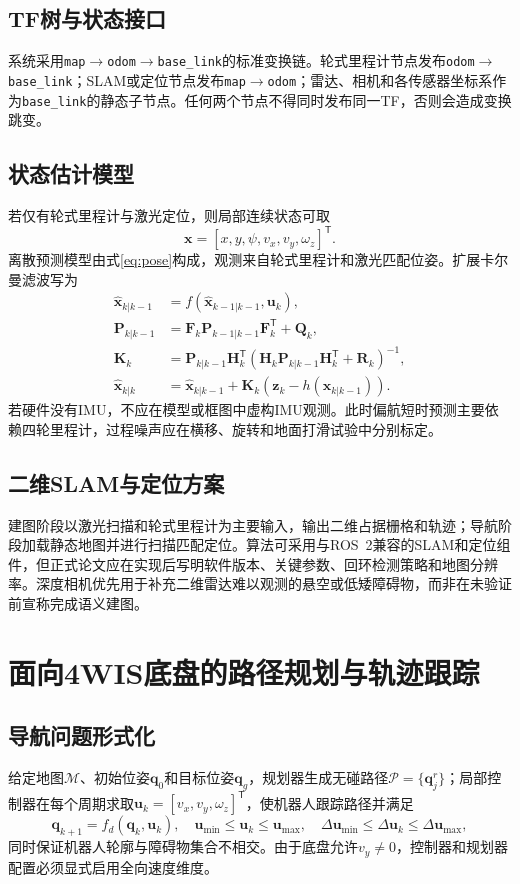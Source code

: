 \documentclass[UTF8,openany,12pt,a4paper]{ctexrep}
\newcommand{\trans}{^{\mathsf T}}
\begin{document}
\section{TF树与状态接口}
系统采用\texttt{map}$\to$\texttt{odom}$\to$\texttt{base\_link}的标准变换链。轮式里程计节点发布\texttt{odom}$\to$\texttt{base\_link}；SLAM或定位节点发布\texttt{map}$\to$\texttt{odom}；雷达、相机和各传感器坐标系作为\texttt{base\_link}的静态子节点。任何两个节点不得同时发布同一TF，否则会造成变换跳变。

\section{状态估计模型}
若仅有轮式里程计与激光定位，则局部连续状态可取
\begin{equation}\bm x=[x,y,\psi,v_x,v_y,\omega_z]\trans.\end{equation}
离散预测模型由式\eqref{eq:pose}构成，观测来自轮式里程计和激光匹配位姿。扩展卡尔曼滤波写为
\begin{align}
\hat{\bm x}_{k|k-1}&=f(\hat{\bm x}_{k-1|k-1},\bm u_k),\\
\bm P_{k|k-1}&=\bm F_k\bm P_{k-1|k-1}\bm F_k\trans+\bm Q_k,\\
\bm K_k&=\bm P_{k|k-1}\bm H_k\trans(\bm H_k\bm P_{k|k-1}\bm H_k\trans+\bm R_k)^{-1},\\
\hat{\bm x}_{k|k}&=\hat{\bm x}_{k|k-1}+\bm K_k(\bm z_k-h(\hat{\bm x}_{k|k-1})).
\end{align}
若硬件没有IMU，不应在模型或框图中虚构IMU观测。此时偏航短时预测主要依赖四轮里程计，过程噪声应在横移、旋转和地面打滑试验中分别标定。

\section{二维SLAM与定位方案}
建图阶段以激光扫描和轮式里程计为主要输入，输出二维占据栅格和轨迹；导航阶段加载静态地图并进行扫描匹配定位。算法可采用与ROS~2兼容的SLAM和定位组件，但正式论文应在实现后写明软件版本、关键参数、回环检测策略和地图分辨率。深度相机优先用于补充二维雷达难以观测的悬空或低矮障碍物，而非在未验证前宣称完成语义建图。

\chapter{面向4WIS底盘的路径规划与轨迹跟踪}
\section{导航问题形式化}
给定地图$\mathcal M$、初始位姿$\bm q_0$和目标位姿$\bm q_g$，规划器生成无碰路径$\mathcal P=\{\bm q_j^r\}$；局部控制器在每个周期求取$\bm u_k=[v_x,v_y,\omega_z]\trans$，使机器人跟踪路径并满足
\begin{equation}
\bm q_{k+1}=f_d(\bm q_k,\bm u_k),\quad
\bm u_{\min}\leq\bm u_k\leq\bm u_{\max},\quad
\Delta\bm u_{\min}\leq\Delta\bm u_k\leq\Delta\bm u_{\max},
\end{equation}
同时保证机器人轮廓与障碍物集合不相交。由于底盘允许$v_y\neq0$，控制器和规划器配置必须显式启用全向速度维度。
\end{document}
